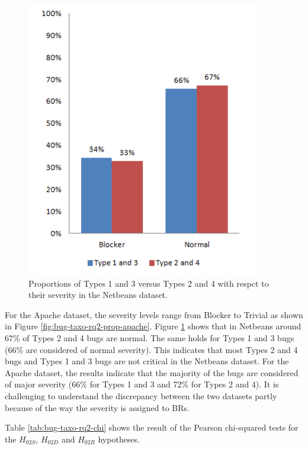 \begin{figure}[h!]
  \centering
    \includegraphics[scale=0.6]{media/bug-taxo-rq2-prop-netbeans.png}
    \caption{Proportions of Types 1 and 3 versus Types 2 and 4 with respct to their severity in the Netbeans dataset.
    \label{fig:bug-taxo-rq2-prop-netbeans}}
\end{figure}

For the Apache dataset, the severity levels range from
Blocker to Trivial as shown in Figure \ref{fig:bug-taxo-rq2-prop-apache}. Figure \ref{fig:bug-taxo-rq2-prop-netbeans} shows that
in Netbeans around 67\% of Types 2 and 4 bugs are normal.
The same holds for Types 1 and 3 bugs (66\% are considered
of normal severity). This indicates that most Types 2 and 4
bugs and Types 1 and 3 bugs are not critical in the Netbeans
dataset. For the Apache dataset, the results indicate that the
majority of the bugs are considered of major severity (66\%
for Types 1 and 3 and 72\% for Types 2 and 4). It is
challenging to understand the discrepancy between the two
datasets partly because of the way the severity is assigned to
BRs.

Table \ref{tab:bug-taxo-rq2-chi} shows the result of the Pearson chi-squared tests
for the $H_{02S}$, $H_{02D}$ and $H_{02R}$ hypotheses.

